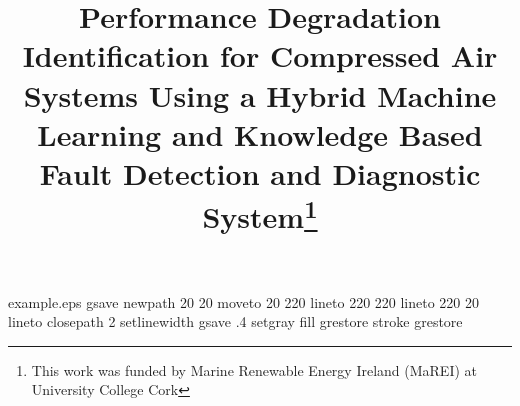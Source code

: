 %
%
%
%
%
\begin{filecontents*}{example.eps}
gsave
newpath
  20 20 moveto
  20 220 lineto
  220 220 lineto
  220 20 lineto
closepath
2 setlinewidth
gsave
  .4 setgray fill
grestore
stroke
grestore
\end{filecontents*}
%
\RequirePackage{fix-cm}
%
\documentclass[twocolumn, natbib]{svjour3}          %
%
\smartqed  %
%
\usepackage{graphicx}
%
\usepackage{mathptmx}      %
%
%
\usepackage{hyperref}



\usepackage{booktabs}
\usepackage{multirow}
\usepackage{tabularx}
\usepackage{longtable}
\usepackage{lipsum}
\usepackage{lscape}
\usepackage{siunitx}
\usepackage{amsmath}
\usepackage{rotating}
%
%


\title{Performance Degradation Identification for Compressed Air Systems Using a Hybrid Machine Learning and Knowledge Based Fault Detection and Diagnostic System\thanks{This work was funded by Marine Renewable Energy Ireland (MaREI) at University College Cork}
}

